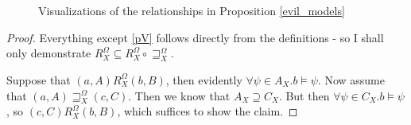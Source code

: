 \begin{figure}[ht]
\centering
{}
\hspace{1cm}
\hspace{1cm}
\caption{Visualizations of the relationships in Proposition \ref{evil_models}}
\end{figure}
\begin{proof}
  Everything except \ref{pV} follows directly from the definitions - so I shall only
  demonstrate $R^{\Omega}_X \subseteq R^{\Omega}_X \circ
  \sqsupseteq^{\Omega}_X$.
  
  Suppose that $(a, A) R^{\Omega}_X (b, B)$, then evidently $\forall \psi \in
  A_X .b \models \psi$. 
  Now assume that $(a, A) \sqsupseteq_X^{\Omega} (c,
  C)$.  Then we know that $A_X \supseteq C_X$.
  But then $\forall \psi \in
  C_X .b \models \psi$, so $(c, C) R^{\Omega}_X (b, B)$, which
  suffices to show the claim.
\end{proof}

